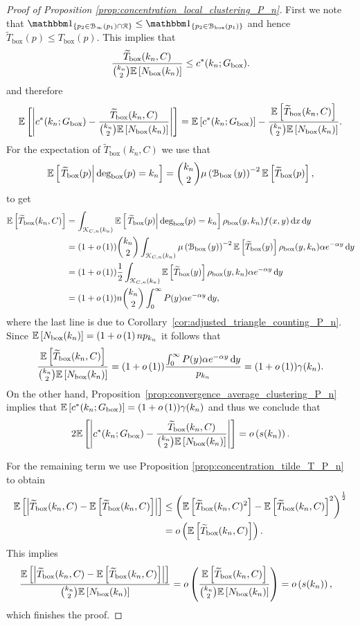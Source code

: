 \begin{proof}[Proof of Proposition \ref{prop:concentration_local_clustering_P_n}]
First we note that $\ind{p_2 \in \BallPo{p_1} \cap \Rcal} \le \ind{p_2 \in \BallPon{p_1}}$ and hence $\widetilde{T}_{\text{box}}(p) \le T_{\text{box}}(p)$. This implies that
\[
	 \frac{\widetilde{T}_{\text{box}}(k_n,C)}{\binom{k_n}{2}\mathbb{E}\left[N_{\text{box}}(k_n)\right]} \le c^\ast(k_n; G_{\text{box}}). 
\]
and therefore
\[
	\mathbb{E}\left[\left|c^\ast(k_n; G_{\text{box}}) - \frac{\widetilde{T}_{\text{box}}(k_n,C)}{\binom{k_n}{2}\mathbb{E}\left[N_{\text{box}}(k_n)\right]}\right|\right]
	= \mathbb{E}\left[c^\ast(k_n; G_{\text{box}})\right] 
	- \frac{\mathbb{E}\left[\widetilde{T}_{\text{box}}(k_n,C)\right]}{\binom{k_n}{2}\mathbb{E}\left[N_{\text{box}}(k_n)\right]}.
\]
For the expectation of $\widetilde{T}_{\text{box}}(k_n,C)$ we use that 
\[
	\mathbb{E}\left[\left.\widetilde{T}_{\text{box}}(p)\right|\text{deg}_{\text{box}}(p) = k_n\right]
= \binom{k_n}{2} \mu\left({\mathcal B}_{\text{box}}\left(y\right)\right)^{-2} \mathbb{E}\left[\widetilde{T}_{\text{box}}(p)\right],
\] to get
\begin{align*}
	\mathbb{E}\left[\widetilde{T}_{\text{box}}(k_n,C)\right] 
	&= \int_{{\mathcal K}_{C,n}(k_n)} \mathbb{E}\left[\left.\widetilde{T}_{\text{box}}(p)\right|\text{deg}_{\text{box}}(p) = k_n\right]
		\rho_{\text{box}}(y,k_n) f(x,y) \operatorname{\mathrm{d}\hspace{-2pt}} x \operatorname{\mathrm{d}\hspace{-2pt}} y\\
	&= (1+o\left(1\right)) \binom{k_n}{2} \int_{{\mathcal K}_{C,n}(k_n)} \mu\left({\mathcal B}_{\text{box}}\left(y\right)\right)^{-2} \mathbb{E}\left[\widetilde{T}_{\text{box}}(y)\right]
		\rho_{\text{box}}(y,k_n) \alpha e^{-\alpha y} \operatorname{\mathrm{d}\hspace{-2pt}} y\\
	&= (1+o\left(1\right)) \frac{1}{2} \int_{{\mathcal K}_{C,n}(k_n)} \mathbb{E}\left[\widetilde{T}_{\text{box}}(y)\right]
			\rho_{\text{box}}(y,k_n) \alpha e^{-\alpha y} \operatorname{\mathrm{d}\hspace{-2pt}} y\\
	&= (1+o\left(1\right)) n \binom{k_n}{2} \int_0^\infty P(y) \alpha e^{-\alpha y} \operatorname{\mathrm{d}\hspace{-2pt}} y,
\end{align*}
where the last line is due to Corollary~\ref{cor:adjusted_triangle_counting_P_n}. Since $\mathbb{E}\left[N_{\text{box}}(k_n)\right] = (1+o\left(1\right)n p_{k_n}$ it follows that
\[
	\frac{\mathbb{E}\left[\widetilde{T}_{\text{box}}(k_n,C)\right]}{\binom{k_n}{2}\mathbb{E}\left[N_{\text{box}}(k_n)\right]}
	= (1+o\left(1\right)) \frac{\int_0^\infty P(y) \alpha e^{-\alpha y} \operatorname{\mathrm{d}\hspace{-2pt}} y}{p_{k_n}}
	= (1 + o\left(1\right)) \gamma(k_n).
\]
On the other hand, Proposition~\ref{prop:convergence_average_clustering_P_n} implies that $\mathbb{E}\left[c^\ast(k_n; G_{\text{box}})\right] = (1+o\left(1\right))\gamma(k_n)$ and thus we conclude that
\[
	2\mathbb{E}\left[\left|c^\ast(k_n; G_{\text{box}}) - \frac{\widetilde{T}_{\text{box}}(k_n,C)}{\binom{k_n}{2}\mathbb{E}\left[N_{\text{box}}(k_n)\right]}\right|\right]
	= o\left(s(k_n)\right).	
\]

For the remaining term we use Proposition \ref{prop:concentration_tilde_T_P_n} to obtain
\begin{align*}
	\mathbb{E}\left[\left|\widetilde{T}_{\text{box}}(k_n,C) - \mathbb{E}\left[\widetilde{T}_{\text{box}}(k_n,C)\right]\right|\right]
	&\le \left(\mathbb{E}\left[\widetilde{T}_{\text{box}}(k_n,C)^2\right] 
		- \mathbb{E}\left[\widetilde{T}_{\text{box}}(k_n,C)\right]^2\right)^{\frac{1}{2}}\\
	&= o\left(\mathbb{E}\left[\widetilde{T}_{\text{box}}(k_n,C)\right]\right).
\end{align*}
This implies
\begin{align*}
	\frac{\mathbb{E}\left[\left|\widetilde{T}_{\text{box}}(k_n,C) - \mathbb{E}\left[\widetilde{T}_{\text{box}}(k_n,C)\right]\right|\right]}
		{\binom{k_n}{2}\mathbb{E}\left[N_{\text{box}}(k_n)\right]}
	&= o\left(\frac{\mathbb{E}\left[\widetilde{T}_{\text{box}}(k_n,C)\right]}{\binom{k_n}{2}\mathbb{E}\left[N_{\text{box}}(k_n)\right]}\right)
	= o\left(s(k_n)\right),
\end{align*}
which finishes the proof.
\end{proof}

